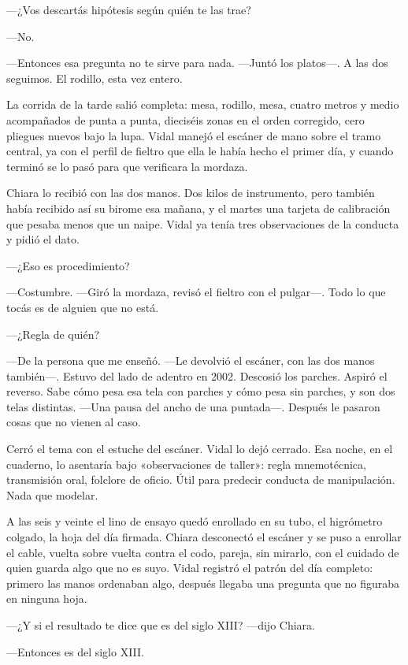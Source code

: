 ---¿Vos descartás hipótesis según quién te las trae?

---No.

---Entonces esa pregunta no te sirve para nada. ---Juntó los platos---. A las dos seguimos. El rodillo, esta vez entero.

La corrida de la tarde salió completa: mesa, rodillo, mesa, cuatro metros y medio acompañados de punta a punta, dieciséis zonas en el orden corregido, cero pliegues nuevos bajo la lupa. Vidal manejó el escáner de mano sobre el tramo central, ya con el perfil de fieltro que ella le había hecho el primer día, y cuando terminó se lo pasó para que verificara la mordaza.

Chiara lo recibió con las dos manos. Dos kilos de instrumento, pero también había recibido así su birome esa mañana, y el martes una tarjeta de calibración que pesaba menos que un naipe. Vidal ya tenía tres observaciones de la conducta y pidió el dato.

---¿Eso es procedimiento?

---Costumbre. ---Giró la mordaza, revisó el fieltro con el pulgar---. Todo lo que tocás es de alguien que no está.

---¿Regla de quién?

---De la persona que me enseñó. ---Le devolvió el escáner, con las dos manos también---. Estuvo del lado de adentro en 2002. Descosió los parches. Aspiró el reverso. Sabe cómo pesa esa tela con parches y cómo pesa sin parches, y son dos telas distintas. ---Una pausa del ancho de una puntada---. Después le pasaron cosas que no vienen al caso.

Cerró el tema con el estuche del escáner. Vidal lo dejó cerrado. Esa noche, en el cuaderno, lo asentaría bajo «observaciones de taller»: regla mnemotécnica, transmisión oral, folclore de oficio. Útil para predecir conducta de manipulación. Nada que modelar.

A las seis y veinte el lino de ensayo quedó enrollado en su tubo, el higrómetro colgado, la hoja del día firmada. Chiara desconectó el escáner y se puso a enrollar el cable, vuelta sobre vuelta contra el codo, pareja, sin mirarlo, con el cuidado de quien guarda algo que no es suyo. Vidal registró el patrón del día completo: primero las manos ordenaban algo, después llegaba una pregunta que no figuraba en ninguna hoja.

---¿Y si el resultado te dice que es del siglo XIII? ---dijo Chiara.

---Entonces es del siglo XIII.

